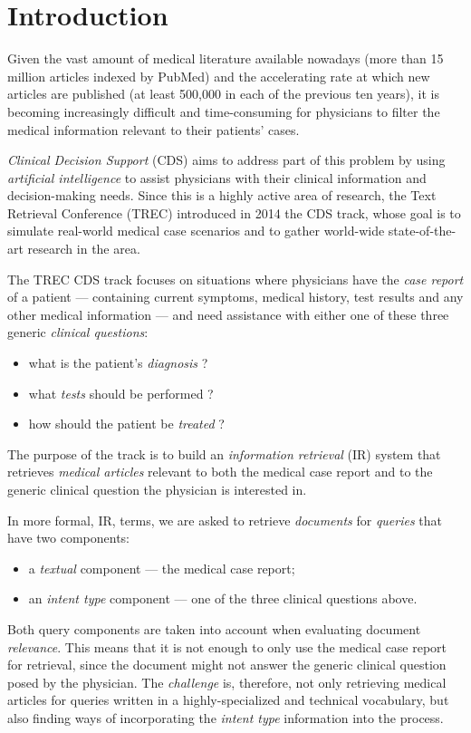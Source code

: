\chapter{Introduction}
Given the vast amount of medical literature available nowadays (more than 15 million articles indexed by PubMed)
and the accelerating rate at which new articles are published (at least 500,000 in each of the previous ten years),
it is becoming increasingly difficult and time-consuming for physicians to filter the medical information
relevant to their patients' cases.

\emph{Clinical Decision Support} (CDS) aims to address part of this problem by using \emph{artificial intelligence}
to assist physicians with their clinical information and decision-making needs.
Since this is a highly active area of research,
the Text Retrieval Conference (TREC)
introduced in 2014 the CDS track,
whose goal is to simulate real-world medical case scenarios and to gather world-wide state-of-the-art research in the area.

The TREC CDS track focuses on situations where physicians have the \emph{case report} of a patient
--- containing current symptoms, medical history, test results and any other medical information ---
and need assistance with either one of these three generic
\emph{clinical questions}:
\begin{itemize}[noitemsep,nolistsep]
 \item what is the patient's \emph{diagnosis} ?
 \item what \emph{tests} should be performed ?
 \item how should the patient be \emph{treated} ?\end{itemize}

The purpose of the track is to build an \emph{information retrieval} (IR) system that
retrieves \emph{medical articles} relevant to both the medical
case report and to the generic clinical question the physician is interested in.

In more formal, IR, terms, we are asked to retrieve \emph{documents} for \emph{queries} that have two components:
\begin{itemize}[noitemsep, nolistsep]
 \item a \emph{textual} component --- the medical case report;
 \item an \emph{intent type} component --- one of the three clinical questions above.
\end{itemize}

Both query components are taken into account when evaluating document \emph{relevance}.
This means that it is not enough to only use the medical case report
for retrieval, since the document might not answer the generic clinical question posed by the physician.
The \emph{challenge} is, therefore, not only retrieving medical articles for queries written in a highly-specialized and technical
vocabulary, but also finding ways of incorporating the \emph{intent type} information into the process.

